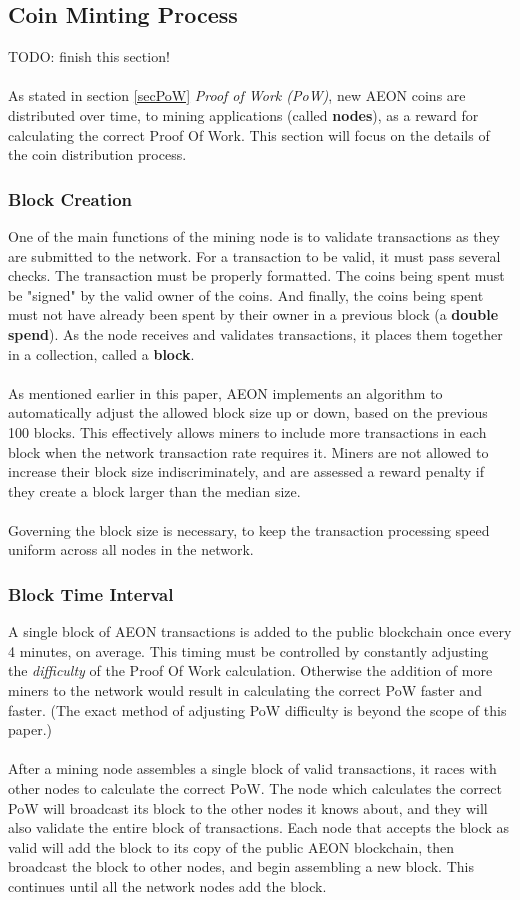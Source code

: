 \subsection{Coin Minting Process}
TODO:  finish this section!\\
\\
As stated in section \ref{secPoW} \textit{Proof of Work (PoW)}, new AEON coins are distributed over time, to mining applications (called \textbf{nodes}), as a reward for calculating the correct Proof Of Work. This section will focus on the details of the coin distribution process.

\subsubsection{Block Creation}
One of the main functions of the mining node is to validate transactions as they are submitted to the network. For a transaction to be valid, it must pass several checks. The transaction must be properly formatted. The coins being spent must be "signed" by the valid owner of the coins. And finally, the coins being spent must not have already been spent by their owner in a previous block (a \textbf{double spend}). As the node receives and validates transactions, it places them together in a collection, called a \textbf{block}.\\
\\
As mentioned earlier in this paper, AEON implements an algorithm to automatically adjust the allowed block size up or down, based on the previous 100 blocks.  This effectively allows miners to include more transactions in each block when the network transaction rate requires it. Miners are not allowed to increase their block size indiscriminately, and are assessed a reward penalty if they create a block larger than the median size.\\
\\
Governing the block size is necessary, to keep the transaction processing speed uniform across all nodes in the network.


\subsubsection{Block Time Interval}
A single block of AEON transactions is added to the public blockchain once every 4 minutes, on average.  This timing must be controlled by constantly adjusting the \textit{difficulty} of the Proof Of Work calculation.  Otherwise the addition of more miners to the network would result in calculating the correct PoW faster and faster.  (The exact method of adjusting PoW difficulty is beyond the scope of this paper.)\\
\\
After a mining node assembles a single block of valid transactions, it races with other nodes to calculate the correct PoW. The node which calculates the correct PoW will broadcast its block to the other nodes it knows about, and they will also validate the entire block of transactions. Each node that accepts the block as valid will add the block to its copy of the public AEON blockchain, then broadcast the block to other nodes, and begin assembling a new block.  This continues until all the network nodes add the block.

